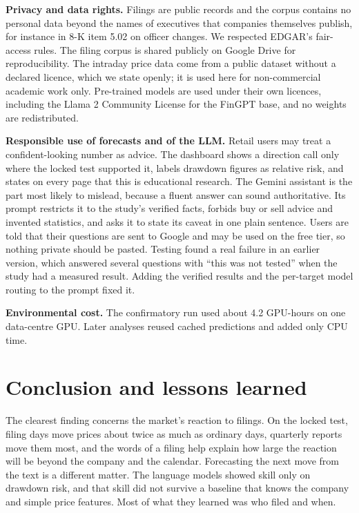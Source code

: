 \documentclass[11pt,a4paper]{article}
\begin{document}
\textbf{Privacy and data rights.} Filings are public records and the corpus contains no personal data beyond the names of executives that companies themselves publish, for instance in 8-K item 5.02 on officer changes. We respected EDGAR's fair-access rules. The filing corpus is shared publicly on Google Drive for reproducibility. The intraday price data come from a public dataset without a declared licence, which we state openly; it is used here for non-commercial academic work only. Pre-trained models are used under their own licences, including the Llama 2 Community License for the FinGPT base, and no weights are redistributed.

\textbf{Responsible use of forecasts and of the LLM.} Retail users may treat a confident-looking number as advice. The dashboard shows a direction call only where the locked test supported it, labels drawdown figures as relative risk, and states on every page that this is educational research. The Gemini assistant is the part most likely to mislead, because a fluent answer can sound authoritative. Its prompt restricts it to the study's verified facts, forbids buy or sell advice and invented statistics, and asks it to state its caveat in one plain sentence. Users are told that their questions are sent to Google and may be used on the free tier, so nothing private should be pasted. Testing found a real failure in an earlier version, which answered several questions with ``this was not tested'' when the study had a measured result. Adding the verified results and the per-target model routing to the prompt fixed it.

\textbf{Environmental cost.} The confirmatory run used about 4.2 GPU-hours on one data-centre GPU. Later analyses reused cached predictions and added only CPU time.

\section{Conclusion and lessons learned}

The clearest finding concerns the market's reaction to filings. On the locked test, filing days move prices about twice as much as ordinary days, quarterly reports move them most, and the words of a filing help explain how large the reaction will be beyond the company and the calendar. Forecasting the next move from the text is a different matter. The language models showed skill only on drawdown risk, and that skill did not survive a baseline that knows the company and simple price features. Most of what they learned was who filed and when.
\end{document}
